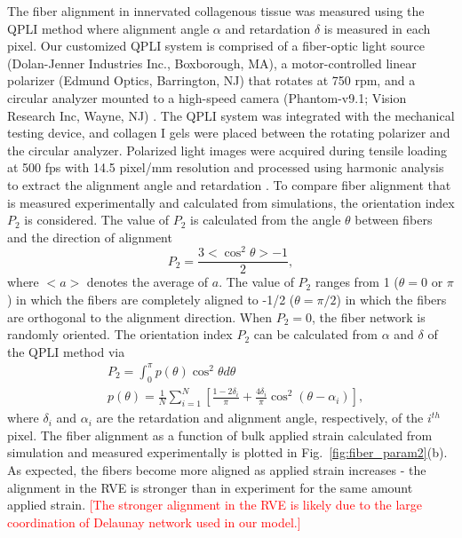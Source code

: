\documentclass[10pt]{asme2ej}
\begin{document}
The fiber alignment in innervated collagenous tissue was measured using the QPLI method \cite{Quinn:2008df,Quinn:2009bf} where alignment angle $\alpha$ and retardation $\delta$ is measured in each pixel. Our customized QPLI system is comprised of a fiber-optic light source (Dolan-Jenner Industries Inc., Boxborough, MA), a motor-controlled linear polarizer (Edmund Optics, Barrington, NJ) that rotates at 750 rpm, and a circular analyzer mounted to a high-speed camera (Phantom-v9.1; Vision Research Inc, Wayne, NJ) \cite{Zhang:2016ga}. The QPLI system was integrated with the mechanical testing device, and collagen I gels were placed between the rotating polarizer and the circular analyzer. Polarized light images were acquired during tensile loading at 500 fps with 14.5 pixel/mm resolution and processed using harmonic analysis to extract the alignment angle and retardation \cite{Tower:2002hk,Quinn:2008df}. To compare fiber alignment that is measured experimentally and calculated from simulations, the orientation index $P_2$ is considered. The value of $P_2$ is calculated from the angle $\theta$ between fibers and the direction of alignment
%
\begin{equation}
P_2 = \frac{3 <\cos^2\theta> - 1}{2},
\label{eq:P2_simulation}
\end{equation}
%
where $<a>$ denotes the average of $a$. The value of $P_2$ ranges from 1 ($\theta=0$ or $\pi$) in which the fibers are completely aligned to -1/2 ($\theta=\pi/2$) in which the fibers are orthogonal to the alignment direction. When $P_2=0$, the fiber network is randomly oriented. The orientation index $P_2$ can be calculated from $\alpha$ and $\delta$ of the QPLI method via
%
\begin{align}
&P_2 = \int_0^{\pi} p(\theta) \cos^2\theta d\theta \nonumber\\
&p(\theta) = \frac{1}{N} \sum_{i=1}^N \left[ \frac{1-2\delta_i}{\pi} + \frac{4 \delta_i}{\pi}\cos^2(\theta - \alpha_i)\right],
\label{eq:P2_experiment}
\end{align}
%
where $\delta_i$ and $\alpha_i$ are the retardation and alignment angle, respectively, of the $i^{th}$ pixel. The fiber alignment as a function of bulk applied strain calculated from simulation and measured experimentally is plotted in Fig.\ \ref{fig:fiber_param2}(b). As expected, the fibers become more aligned as applied strain increases - the alignment in the RVE is stronger than in experiment for the same amount applied strain. \textcolor{red}{[The stronger alignment in the RVE is likely due to the large coordination of Delaunay network used in our model.]}
\end{document}
